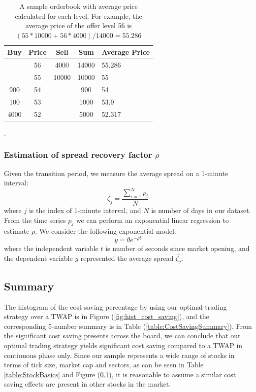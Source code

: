 \documentclass{article}
\begin{document}
\begin{table}[h]
  \centering
  \begin{tabular}{c|c|c|c|l}
    \hline
    \textbf{Buy} & \textbf{Price} & \textbf{Sell} & \textbf{Sum} & \multicolumn{1}{c}{\textbf{Average Price}} \\ \hline
                 & 56             & 4000          & 14000        & 55.286                                     \\ \hline
                 & 55             & 10000         & 10000        & 55                                         \\ \hline
    900          & 54             &               & 900          & 54                                         \\ \hline
    100          & 53             &               & 1000         & 53.9                                       \\ \hline
    4000         & 52             &               & 5000         & 52.317                                     \\ \hline
  \end{tabular}
  \caption{A sample orderbook with average price calculated for each level. For example, the average price of the offer level 56 is $(55*10000+56*4000)/14000 = 55.286$}.
  \label{tbl:bookAvgPxConversion}
\end{table}

\subsubsection{Estimation of spread recovery factor $\rho$}

Given the transition period, we measure the average spread on a 1-minute interval:
\[
  \bar{\zeta_j} = \frac{\sum_{i=1}^N p_i}{N}
\]
where $j$ is the index of 1-minute interval, and $N$ is number of days in our dataset. From the time series $p_j$ we can perform an exponential linear regression to estimate $\rho$. We consider the following exponential model:
\[
  y = \theta e^{-\rho t}
\]
where the independent variable $t$ is number of seconds since market opening, and the dependent variable $y$ represented the average spread $\bar{\zeta_j}$.

\subsection{Summary}

The histogram of the cost saving percentage by using our optimal trading strategy over a TWAP is in Figure (\ref{fig:hist_cost_saving}), and the corresponding 5-number summary is in Table (\ref{table:CostSavingSummary}). From the significant cost saving presents across the board, we can conclude that our optimal trading strategy yields significant cost saving compared to a TWAP in continuous phase only. Since our sample represents a wide range of stocks in terms of tick size, market cap and sectors, as can be seen in Table \ref{table:StockBasics} and Figure (\ref{}), it is reasonable to assume a similar cost saving effects are present in other stocks in the market.
\end{document}
